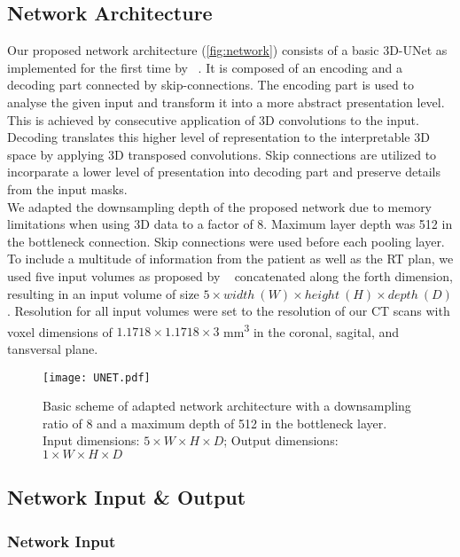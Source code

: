 \subsection{Network Architecture}

Our proposed network architecture (\autoref{fig:network}) consists of a basic 3D-UNet as implemented for the first time by \citeauthor{ronneberger_u-net_2015-1}~\cite{ronneberger_u-net_2015-1}.
It is composed of an encoding and a decoding part connected by skip-connections.
The encoding part is used to analyse the given input and transform it into a more abstract presentation level. 
This is achieved by consecutive application of 3D convolutions to the input.
Decoding translates this higher level of representation to the interpretable 3D space by applying 3D transposed convolutions.
Skip connections are utilized to incorparate a lower level of presentation into decoding part and preserve details from the input masks.\\
We adapted the downsampling depth of the proposed network due to memory limitations when using 3D data to a factor of 8. 
Maximum layer depth was 512 in the bottleneck connection. 
Skip connections were used before each pooling layer. 
To include a multitude of information from the patient as well as the \acs{RT} plan, we used five input volumes as proposed by \citeauthor{kontaxis_deepdose_2020}~\cite{kontaxis_deepdose_2020} concatenated along the forth dimension, resulting in an input volume of size $5 \times width \ (W) \times height \ (H) \times depth \ (D)$.
Resolution for all input volumes were set to the resolution of our CT scans with voxel dimensions of $1.1718 \times 1.1718 \times 3$ mm\textsuperscript{3} in the coronal, sagital, and tansversal plane. 


\begin{figure}[!b]
    \centering
    \texttt{[image: UNET.pdf]}
    \caption{Basic scheme of adapted network architecture with a downsampling ratio of 8 and a maximum depth of 512 in the bottleneck layer. Input dimensions: $5 \times W \times H \times D$; Output dimensions: $1 \times W \times H \times D$}\label{fig:network}
\end{figure}

\subsection{Network Input \& Output}

\subsubsection{Network Input}


